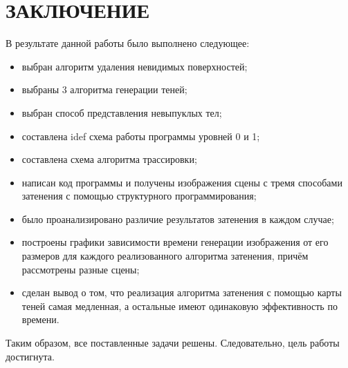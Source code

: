 \chapter*{ЗАКЛЮЧЕНИЕ}

В результате данной работы было выполнено следующее:
\begin{itemize}
    \item выбран алгоритм удаления невидимых поверхностей;
    \item выбраны 3 алгоритма генерации теней;
    \item выбран способ представления невыпуклых тел;
    \item составлена idef схема работы программы уровней 0 и 1;
    \item составлена схема алгоритма трассировки;
    \item
        написан код программы и получены изображения
        сцены с тремя способами затенения с помощью
        структурного программирования;
    \item было проанализировано различие результатов затенения в каждом случае;
    \item
        построены графики зависимости времени
        генерации изображения от его размеров для каждого
        реализованного алгоритма затенения, причём рассмотрены разные сцены;
    \item
        сделан вывод о том, что реализация алгоритма затенения
        с помощью карты теней самая медленная, а остальные имеют одинаковую
        эффективность по времени.
\end{itemize}
Таким образом, все поставленные задачи решены.
Следовательно, цель работы достигнута.